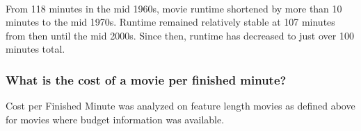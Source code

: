 \documentclass[11pt]{article}
\begin{document}
    \begin{center}
    \end{center}
    { \hspace*{\fill} \\}
    
    From 118 minutes in the mid 1960s, movie runtime shortened by more than
10 minutes to the mid 1970s. Runtime remained relatively stable at 107
minutes from then until the mid 2000s. Since then, runtime has decreased
to just over 100 minutes total.

    \subsubsection{What is the cost of a movie per finished
minute?}\label{what-is-the-cost-of-a-movie-per-finished-minute}

Cost per Finished Minute was analyzed on feature length movies as
defined above for movies where budget information was available.
\end{document}
